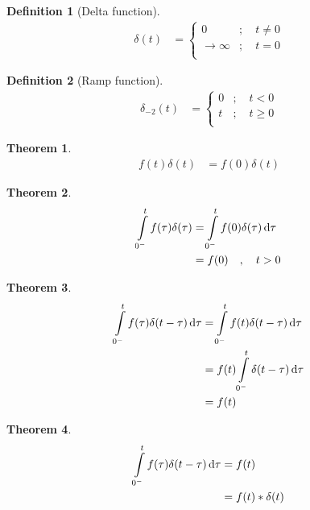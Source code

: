 \documentclass[fleqn, a4paper, 12pt, twoside]{article}
\theoremstyle{definition}
\newtheorem{definition}{Definition}
\theoremstyle{theorem}
\newtheorem{theorem}{Theorem}
\begin{document}
\begin{definition}[Delta function]
	\begin{align*}
		\delta(t) &=
			\begin{cases}
				0          & ;\quad t \neq 0 \\
				\to \infty & ;\quad t = 0    \\
			\end{cases}
	\end{align*}
\end{definition}

\begin{definition}[Ramp function]
	\begin{align*}
		\delta_{-2}(t) &=
			\begin{cases}
				0 & ;\quad t < 0   \\
				t & ;\quad t \ge 0 \\
			\end{cases}
	\end{align*}
\end{definition}

\begin{theorem}
	\begin{align*}
		f(t) \delta(t) & = f(0) \delta(t)
	\end{align*}
\end{theorem}

\begin{theorem}
	\begin{align*}
		\int\limits_{0^-}^{t} f(\tau) \delta(\tau) & = \int\limits_{0^-}^{t} f(0) \delta(\tau) \dif \tau \\
                                                           & = f(0) \quad , \quad t > 0
	\end{align*}
\end{theorem}

\begin{theorem}
	\begin{align*}
		\int\limits_{0^-}^{t} f(\tau) \delta(t - \tau) \dif \tau & = \int\limits_{0^-}^{t} f(t) \delta(t - \tau) \dif \tau \\
                                                                         & = f(t) \int\limits_{0^-}^{t} \delta(t - \tau) \dif \tau \\
                                                                         & = f(t)
	\end{align*}
\end{theorem}

\begin{theorem}
	\begin{align*}
		\int\limits_{0^-}^{t} f(\tau) \delta(t - \tau) \dif \tau & = f(t) \\
                                                                         & = f(t) \ast \delta(t)
	\end{align*}
\end{theorem}
\end{document}
